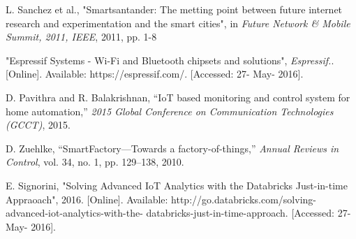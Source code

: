 \documentclass[journal,twoside]{IEEEtran}
\begin{document}
\begin{thebibliography}{99}
        L. Sanchez et al.,
        "Smartsantander: The metting point between future internet research and experimentation and the smart cities", 
        in \emph{Future Network \& Mobile Summit, 2011, IEEE}, 2011, pp. 1-8

        "Espressif Systems - Wi-Fi and Bluetooth chipsets and solutions", \emph{Espressif.}. [Online]. Available: https://espressif.com/. [Accessed: 27- May- 2016].

       D. Pavithra and R. Balakrishnan, 
       “IoT based monitoring and control system for home automation,” 
       \emph{2015 Global Conference on Communication Technologies (GCCT)}, 2015. 

       D. Zuehlke, 
       “SmartFactory—Towards a factory-of-things,” 
       \emph{Annual Reviews in Control}, vol. 34, no. 1, pp. 129–138, 2010. 

        E. Signorini, 
        "Solving Advanced IoT Analytics with the Databricks Just-in-time Appraoach", 2016. [Online]. Available: http://go.databricks.com/solving-advanced-iot-analytics-with-the- databricks-just-in-time-approach. [Accessed: 27- May- 2016].


\end{thebibliography}

% 



\end{document}
